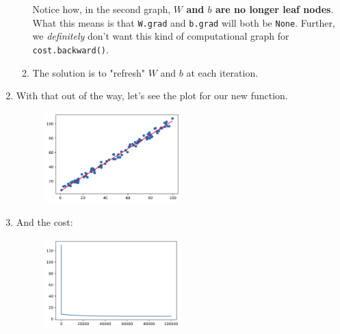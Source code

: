 \documentclass{article}
\begin{document}
\begin{enumerate}
\begin{enumerate}
\begin{figure}[H]
\begin{center}
            \end{center} \end{figure}
            Notice how, in the second graph, \textbf{$W$ and $b$ are no longer leaf nodes}. What this means
            is that {\tt W.grad} and {\tt b.grad} will both be {\tt None}. Further, we \emph{definitely} don't want 
            this kind of computational graph for {\tt cost.backward()}.
            \item The solution is to "refresh" $W$ and $b$ at each iteration.
        \end{enumerate}
        \item With that out of the way, let's see the plot for our new function.
        \begin{figure}[H] \begin{center}
            \includegraphics[width = 0.5\textwidth]{plot3.png}
        \end{center} \end{figure}
        \item And the cost:
        \begin{figure}[H] \begin{center}
            \includegraphics[width = 0.5\textwidth]{plot4.png}
        \end{center} \end{figure}  
    \end{enumerate}
    \newpage
\end{document}
